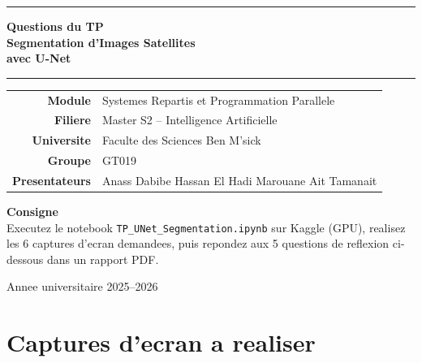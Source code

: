 \documentclass[12pt,a4paper]{article}
\begin{document}
\begin{titlepage}
  \centering
  \vspace*{2cm}

  {\color{primary}\rule{\linewidth}{2pt}}
  \vspace{0.5cm}

  {\Huge\bfseries Questions du TP}\\[0.4cm]
  {\LARGE\bfseries\color{primary} Segmentation d'Images Satellites\\avec U-Net}

  \vspace{0.5cm}
  {\color{primary}\rule{\linewidth}{2pt}}

  \vspace{1.5cm}

  {\large
    \begin{tabular}{rl}
      \textbf{Module}       & Systemes Repartis et Programmation Parallele \\[4pt]
      \textbf{Filiere}      & Master S2 -- Intelligence Artificielle \\[4pt]
      \textbf{Universite}   & Faculte des Sciences Ben M'sick \\[4pt]
      \textbf{Groupe}       & GT019 \\[4pt]
      \textbf{Presentateurs}& Anass Dabibe \quad Hassan El Hadi \quad Marouane Ait Tamanait \\
    \end{tabular}
  }

  \vspace{2cm}

  \begin{tcolorbox}[colback=primary!5, colframe=primary, width=0.85\linewidth,
    boxrule=1pt, left=10pt, right=10pt, top=8pt, bottom=8pt]
    \centering
    \textbf{Consigne} \\[6pt]
    Executez le notebook \texttt{TP\_UNet\_Segmentation.ipynb} sur Kaggle (GPU),
    realisez les 6 captures d'ecran demandees, puis repondez aux 5 questions
    de reflexion ci-dessous dans un rapport PDF.
  \end{tcolorbox}

  \vfill
  {\color{gray}\small Annee universitaire 2025--2026}
\end{titlepage}

\section{Captures d'ecran a realiser}
\end{document}
